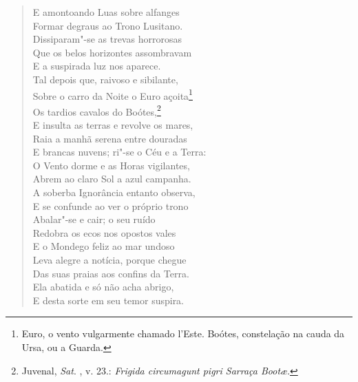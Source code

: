 \begin{verse}
E amontoando Luas sobre alfanges\\ %
Formar degraus ao Trono Lusitano.\\
Dissiparam"-se as trevas horrorosas\\
Que os belos horizontes assombravam\\
E a suspirada luz nos aparece.\\
Tal depois que, raivoso e sibilante,\\
Sobre o carro da Noite o Euro açoita\footnote{ Euro, o vento
vulgarmente chamado l'Este. Boótes, constelação na cauda da Ursa, ou a Guarda.}\\
Os tardios cavalos do Boótes,\footnote{ Juvenal, \textit{Sat}. , v. 23.:
\textit{Frigida circumagunt pigri Sarraça Boot\ae}.}\\
E insulta as terras e revolve os mares,\\
Raia a manhã serena entre douradas\\
E brancas nuvens; ri"-se o Céu e a Terra:\\
O Vento dorme e as Horas vigilantes,\\
Abrem ao claro Sol a azul campanha. \\[10pt]


A soberba Ignorância entanto observa,\\			\index{\Ignor}
E se confunde ao ver o próprio trono\\
Abalar"-se e cair; o seu ruído\\
Redobra os ecos nos opostos vales\\
E o Mondego feliz ao mar undoso\\			\index{\Monde}
Leva alegre a notícia, porque chegue\\
Das suas praias aos confins da Terra.\\
Ela abatida e só não acha abrigo,\\
E desta sorte em seu temor suspira. \\[10pt]



\end{verse}
